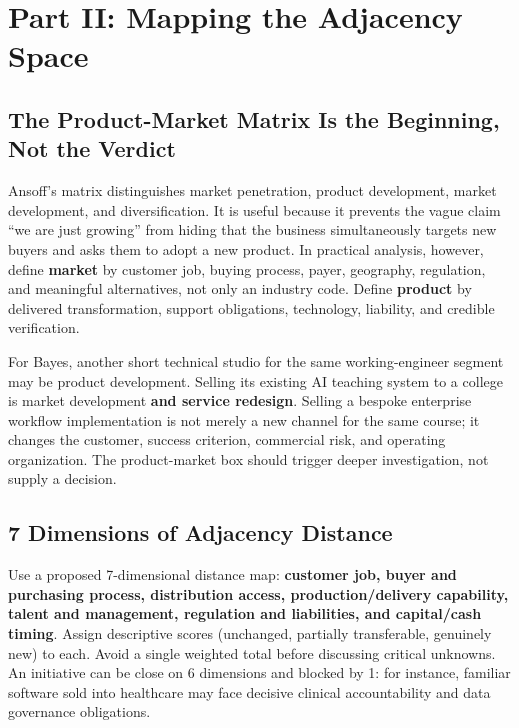 \section*{Part II: Mapping the Adjacency Space}
\label{sec:part2_mapping_the_adjacency_space}

\subsection{The Product-Market Matrix Is the Beginning, Not the Verdict}
\label{sec:product_market_matrix_beginning}

Ansoff's matrix distinguishes market penetration, product development, market development, and diversification. It is useful because it prevents the vague claim ``we are just growing'' from hiding that the business simultaneously targets new buyers and asks them to adopt a new product. In practical analysis, however, define \textbf{market} by customer job, buying process, payer, geography, regulation, and meaningful alternatives, not only an industry code. Define \textbf{product} by delivered transformation, support obligations, technology, liability, and credible verification.

For Bayes, another short technical studio for the same working-engineer segment may be product development. Selling its existing AI teaching system to a college is market development \textbf{and service redesign}. Selling a bespoke enterprise workflow implementation is not merely a new channel for the same course; it changes the customer, success criterion, commercial risk, and operating organization. The product-market box should trigger deeper investigation, not supply a decision.

\subsection{7 Dimensions of Adjacency Distance}
\label{sec:seven_dimensions_adjacency_distance}

Use a proposed 7-dimensional distance map: \textbf{customer job, buyer and purchasing process, distribution access, production/delivery capability, talent and management, regulation and liabilities, and capital/cash timing}. Assign descriptive scores (unchanged, partially transferable, genuinely new) to each. Avoid a single weighted total before discussing critical unknowns. An initiative can be close on 6 dimensions and blocked by 1: for instance, familiar software sold into healthcare may face decisive clinical accountability and data governance obligations.


